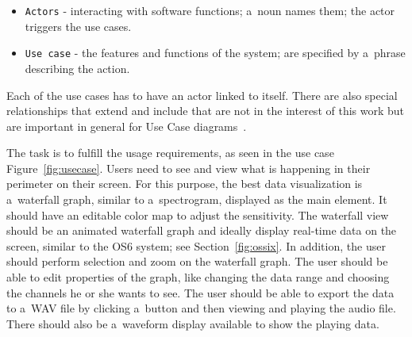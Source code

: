 \begin{itemize}
    \item \texttt{Actors} - interacting with software functions; a~noun names them; the actor triggers the use cases.
    \item \texttt{Use case} - the features and functions of the system; are specified by a~phrase describing the action. 
\end{itemize}

Each of the use cases has to have an actor linked to itself. There are also special relationships that extend and include that are not in the interest of this work but are important in general for Use Case diagrams~\cite{usecase}.

The task is to fulfill the usage requirements, as seen in the use case Figure~\ref{fig:usecase}. Users need to see and view what is happening in their perimeter on their screen. For this purpose, the best data visualization is a~waterfall graph, similar to a~spectrogram, displayed as the main element. It should have an editable color map to adjust the sensitivity. The waterfall view should be an animated waterfall graph and ideally display real-time data on the screen, similar to the OS6 system; see Section~\ref{fig:ossix}. In addition, the user should perform selection and zoom on the waterfall graph. The user should be able to edit properties of the graph, like changing the data range and choosing the channels he or she wants to see. The user should be able to export the data to a~WAV file by clicking a~button and then viewing and playing the audio file. There should also be a~waveform display available to show the playing data.

